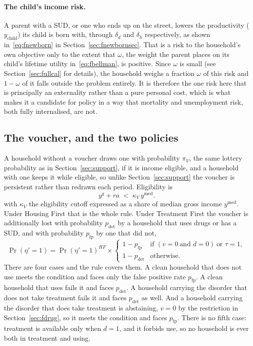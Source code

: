 \documentclass[10pt]{article}
\begin{document}
\paragraph{The child's income risk.}
A parent with a SUD, or one who ends up on the street, lowers the
productivity ($y_{\text{child}}$) its
child is born with, through $\delta_d$ and $\delta_h$ respectively, as shown
in~\eqref{eq:fnewborn} in Section~\ref{sec:fnewbornsec}. That is a risk to the
household's own objective only
to the extent that $\omega$, the weight the parent places on its child's
lifetime utility in~\eqref{eq:fbellman}, is positive. Since $\omega$ is
small (see Section~\ref{sec:fullcal} for details), the
household weighs a fraction $\omega$ of this risk and $1-\omega$ of it falls
outside the problem entirely. It is therefore the one risk here that is
principally an externality rather than a pure personal cost, which is what makes it a
candidate for policy in a way that mortality and unemployment risk, both fully
internalised, are not.

\subsection{The voucher, and the two policies}

A household without a voucher draws one with probability $\pi_V$, the same
lottery probability as in Section~\ref{sec:support}, if it is income
eligible, and a household with one keeps it while eligible, so unlike
Section~\ref{sec:support} the voucher is persistent rather than redrawn each
period. Eligibility is
\begin{equation}\label{eq:felig}
y^{g}+ra\;<\;\kappa_V\,y^{\text{med}}.
\end{equation}
with $\kappa_V$ the eligibility cutoff expressed as a share of
median gross income $y^{\text{med}}$.
Under Housing First that is the whole rule. Under Treatment First the voucher is
additionally lost with probability $p_{\text{det}}$ by a household that uses
drugs or has a SUD, and
with probability $p_{\text{fp}}$ by one that did not,
\begin{equation}\label{eq:fpol}
\Pr(\eta'=1)=\Pr(\eta'=1)^{HF}\times
\begin{cases}
1-p_{\text{fp}} & \text{if } (v=0 \ \text{and } d=0) \ \text{or } \tau=1,\\
1-p_{\text{det}} & \text{otherwise} .
\end{cases}
\end{equation}
There are four cases and the rule covers them. A clean household that does
not use meets the condition and faces only the false positive rate $p_{\text{fp}}$.
A clean household that uses fails it and faces $p_{\text{det}}$. A household
carrying the disorder that does not take treatment fails it and faces
$p_{\text{det}}$ as well. And a household carrying the disorder that does take
treatment is abstaining, $v=0$ by the restriction in
Section~\ref{sec:fdrug}, so it meets the condition and faces $p_{\text{fp}}$.
There is no fifth case: treatment is available only when $d=1$, and it forbids
use, so no household is ever both in treatment and using.
\end{document}
